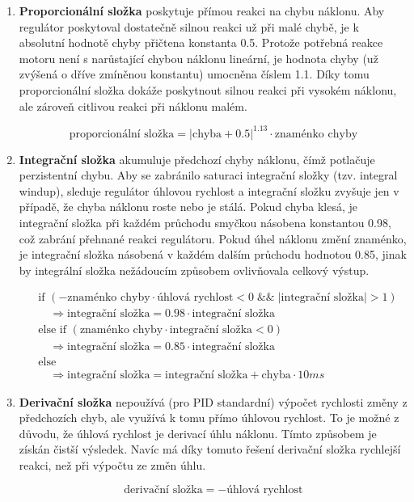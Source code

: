 \begin{enumerate}
  \item{\textbf{Proporcionální složka} poskytuje přímou reakci na chybu náklonu. Aby regulátor poskytoval dostatečně silnou reakci už při malé chybě, je k absolutní hodnotě chyby přičtena konstanta 0.5. Protože potřebná reakce motoru není s narůstající chybou náklonu lineární, je hodnota chyby (už zvýšená o dříve zmíněnou konstantu) umocněna číslem 1.1. Díky tomu proporcionální složka dokáže poskytnout silnou reakci při vysokém náklonu, ale zároveň citlivou reakci při náklonu malém.
  
\[
\text{proporcionální složka} = \left| \text{chyba} + 0.5 \right|^{1.13} \cdot \text{znaménko chyby}
\]
  
  }
  \item{\textbf{Integrační složka} akumuluje předchozí chyby náklonu, čímž potlačuje perzistentní chybu. Aby se zabránilo saturaci integrační složky (tzv. integral windup), sleduje regulátor úhlovou rychlost a integrační složku zvyšuje jen v případě, že chyba náklonu roste nebo je stálá. Pokud chyba klesá, je integrační složka při každém průchodu smyčkou násobena konstantou 0.98, což zabrání přehnané reakci regulátoru. Pokud úhel náklonu změní znaménko, je integrační složka násobená v každém dalším průchodu hodnotou 0.85, jinak by integrální složka nežádoucím způsobem ovlivňovala celkový výstup. 
  } 

\begin{align*}
&\text{if } \left( -\text{znaménko chyby} \cdot \text{úhlová rychlost} < 0 \;\text{\&\&}\; \left| \text{integrační složka} \right| > 1 \right) \\
&\quad \Rightarrow \text{integrační složka} = 0.98 \cdot \text{integrační složka} \\
&\text{else if } \left( \text{znaménko chyby} \cdot \text{integrační složka} < 0 \right) \\
&\quad \Rightarrow \text{integrační složka} = 0.85 \cdot \text{integrační složka} \\
&\text{else} \\
&\quad \Rightarrow \text{integrační složka} = \text{integrační složka} + \text{chyba} \cdot 10 ms
\end{align*}

  \item{\textbf{Derivační složka} nepoužívá (pro PID standardní) výpočet rychlosti změny z předchozích chyb, ale využívá k tomu přímo úhlovou rychlost. To je možné z důvodu, že úhlová rychlost je derivací úhlu náklonu. Tímto způsobem je získán čistší výsledek. Navíc má díky tomuto řešení derivační složka rychlejší reakci, než při výpočtu ze změn úhlu.}

 \[
 \text{derivační složka} = -\text{úhlová rychlost}
 \]
  
\end{enumerate}

